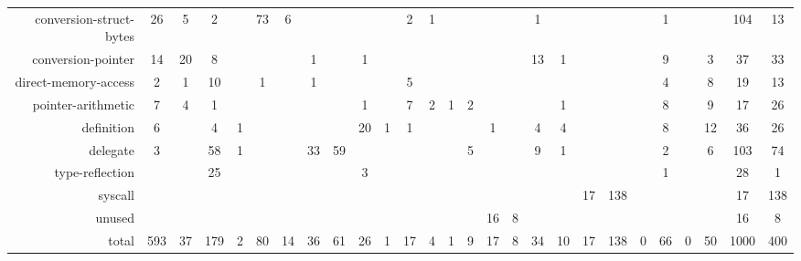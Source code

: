 \begin{table*}[!t]
\begin{adjustbox}{max width=\textwidth}
\begin{tabular}{r|cc|cc|cc|cc|cc|cc|cc|cc|cc|cc|cc|cc|cc}
  conversion-struct-bytes &   26 &    5 &    2 &      &   73 &    6 &      &      &      &      &    2 &    1 &      &      &      &      &    1 &      &       &      &      &    1 &      &      &   104 &   13 \\
       conversion-pointer &   14 &   20 &    8 &      &      &      &    1 &      &    1 &      &      &      &      &      &      &      &   13 &    1 &       &      &      &    9 &      &    3 &    37 &   33 \\
\rowcolor{verylightgray}
     direct-memory-access &    2 &    1 &   10 &      &    1 &      &    1 &      &      &      &    5 &      &      &      &      &      &      &      &       &      &      &    4 &      &    8 &    19 &   13 \\
       pointer-arithmetic &    7 &    4 &    1 &      &      &      &      &      &    1 &      &    7 &    2 &    1 &    2 &      &      &      &    1 &       &      &      &    8 &      &    9 &    17 &   26 \\
\rowcolor{verylightgray}
               definition &    6 &      &    4 &    1 &      &      &      &      &   20 &    1 &    1 &      &      &      &    1 &      &    4 &    4 &       &      &      &    8 &      &   12 &    36 &   26 \\
                 delegate &    3 &      &   58 &    1 &      &      &   33 &   59 &      &      &      &      &      &    5 &      &      &    9 &    1 &       &      &      &    2 &      &    6 &   103 &   74 \\
\rowcolor{verylightgray}
          type-reflection &      &      &   25 &      &      &      &      &      &    3 &      &      &      &      &      &      &      &      &      &       &      &      &    1 &      &      &    28 &    1 \\
                  syscall &      &      &      &      &      &      &      &      &      &      &      &      &      &      &      &      &      &      &    17 &  138 &      &      &      &      &    17 &  138 \\
\rowcolor{verylightgray}
                   unused &      &      &      &      &      &      &      &      &      &      &      &      &      &      &   16 &    8 &      &      &       &      &      &      &      &      &    16 &    8 \\ \hline
                        total &  593 &   37 &  179 &    2 &   80 &   14 &   36 &   61 &   26 &    1 &   17 &    4 &    1 &    9 &   17 &    8 &   34 &   10 &    17 &  138 &    0 &   66 &    0 &   50 &  1000 &  400 \\
\end{tabular}
    \end{adjustbox}
\end{table*}